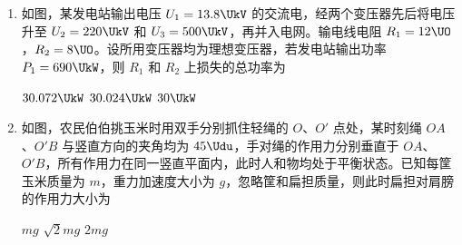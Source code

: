 \documentclass[\gkver]{gaokaozhenti}
\begin{document}
\begin{enumerate}
{对所有电子，竖直方向加速度和位移均相同，根据 $y=\frac{1}{2}at^{2}$ 可知，运动时间相同。

水平方向做匀速运动，则落在 M 的电子初速度较小，即 $E_{k1}<E_{k2}$。

对光电效应过程，根据爱因斯坦光电效应方程 $E_{k}=h\nu-W_{0}$，可知 $\nu_{1}<\nu_{2}$。

故选 A。
}
\item
如图，某发电站输出电压 $U_{1}=13.8\UkV$ 的交流电，经两个变压器先后将电压升至 $U_{2}=220\UkV$ 和 $U_{3}=500\UkV$，再并入电网。输电线电阻 $R_{1}=12\UO$，$R_{2}=8\UO$。设所用变压器均为理想变压器，若发电站输出功率 $P_{1}=690\UkW$，则 $R_{1}$ 和 $R_{2}$ 上损失的总功率为 

\fourchoices[answer=B]
{$30.118\UkW$}
{$30.072\UkW$}
{$30.024\UkW$}
{$30\UkW$}


\item
如图，农民伯伯挑玉米时用双手分别抓住轻绳的 $O$、$O'$ 点处，某时刻绳 $OA$、$O'B$ 与竖直方向的夹角均为 $45\Udu$，手对绳的作用力分别垂直于 $OA$、$O'B$，所有作用力在同一竖直平面内，此时人和物均处于平衡状态。已知每筐玉米质量为 $m$，重力加速度大小为 $g$，忽略筐和扁担质量，则此时扁担对肩膀的作用力大小为 

{$mg$}
{$\sqrt{2}mg$}
{$2mg$}



\end{enumerate}
\end{document}
